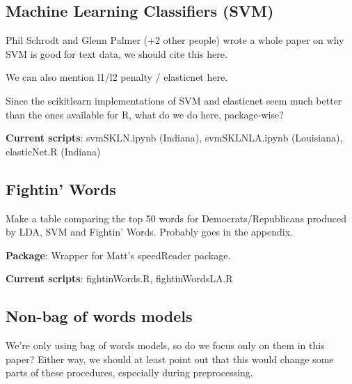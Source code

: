 \documentclass[11pt]{article}
\begin{document}
\subsection{Machine Learning Classifiers (SVM)}
Phil Schrodt and Glenn Palmer (+2 other people) wrote a whole paper on why SVM is good for text data, we should cite this here.

We can also mention l1/l2 penalty / elasticnet here.

Since the scikitlearn implementations of SVM and elasticnet seem much better than the ones available for R, what do we do here, package-wise?

\textbf{Current scripts}: svmSKLN.ipynb (Indiana), svmSKLNLA.ipynb (Louisiana), elasticNet.R (Indiana)

\subsection{Fightin' Words}
Make a table comparing the top 50 words for Democrats/Republicans produced by LDA, SVM and Fightin' Words. Probably goes in the appendix.

\textbf{Package}: Wrapper for Matt's speedReader package.

\textbf{Current scripts}: fightinWords.R, fightinWordsLA.R

\subsection{Non-bag of words models}
We're only using bag of words models, so do we focus only on them in this paper? Either way, we should at least point out that this would change some parts of these procedures, especially during preprocessing.

\newpage

%
%
\end{document}

